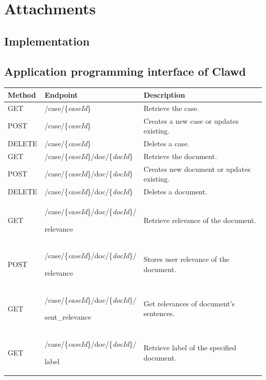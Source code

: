 \documentclass[
  digital, %
  notable,   %
  nolof,     %
  nolot,     %
]{fithesis3}
\begin{document}
\chapter{Attachments}
\section{Implementation}
\newpage
\section{Application programming interface of Clawd}
\label{att:api}
\centering
\begin{tabularx}{13.6cm}{|m{2cm}|m{5.3cm}|m{5cm}|}
\rowcolor{gray!30}
\hline
\textbf{Method} &  \textbf{Endpoint}   &  \vspace{3mm} \textbf{Description}   \\[8pt] \hline
GET  &  /case/\{\textit{caseId}\} & \vspace{2mm} Retrieve the case. \\[6pt] \hline
POST  & /case/\{\textit{caseId}\} & Creates a new case or updates existing. \\ \hline
DELETE  & /case/\{\textit{caseId}\} & \vspace{2mm} Deletes a case.  \\[6pt] \hline
GET  & /case/\{\textit{caseId}\}/doc/\{\textit{docId}\} & \vspace{2mm} Retrieve the document. \\[6pt] \hline
POST  & /case/\{\textit{caseId}\}/doc/\{\textit{docId}\} & Creates new document or updates existing. \\ \hline
DELETE  & /case/\{\textit{caseId}\}/doc/\{\textit{docId}\} & \vspace{2mm} Deletes a document. \\[6pt] \hline
GET  & /case/\{\textit{caseId}\}/doc/\{\textit{docId}\}/\par relevance & Retrieve relevance of the document. \\ \hline
POST  & /case/\{\textit{caseId}\}/doc/\{\textit{docId}\}/\par relevance & Stores user relevance of the document.\\ \hline
GET  & /case/\{\textit{caseId}\}/doc/\{\textit{docId}\}/\par sent\_relevance & Get relevances of document's sentences.\\ \hline
GET  & /case/\{\textit{caseId}\}/doc/\{\textit{docId}\}/\par label & Retrieve label of the specified document. \\ \hline

\end{tabularx}
\end{document}
